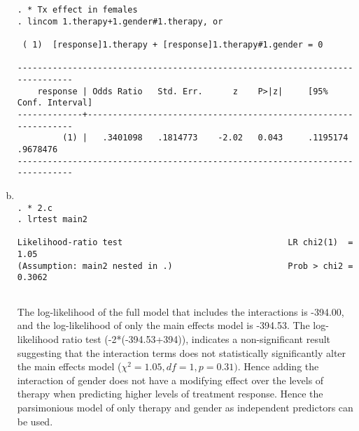 \documentclass{article}
\begin{document}
\begin{enumerate}[a.]
\begin{verbatim}
. * Tx effect in females
. lincom 1.therapy+1.gender#1.therapy, or

 ( 1)  [response]1.therapy + [response]1.therapy#1.gender = 0

------------------------------------------------------------------------------
    response | Odds Ratio   Std. Err.      z    P>|z|     [95% Conf. Interval]
-------------+----------------------------------------------------------------
         (1) |   .3401098   .1814773    -2.02   0.043     .1195174    .9678476
------------------------------------------------------------------------------

\end{verbatim}

\item 

\begin{verbatim}

. * 2.c
. lrtest main2

Likelihood-ratio test                                 LR chi2(1)  =      1.05
(Assumption: main2 nested in .)                       Prob > chi2 =    0.3062
    
\end{verbatim}
The log-likelihood of the full model that includes the interactions is -394.00, and the log-likelihood of only the main effects model is -394.53.  The log-likelihood ratio test (-2*(-394.53+394)), indicates a non-significant result suggesting that the interaction terms does not statistically significantly alter the main effects model ($\chi^{2}=1.05, df=1, p=0.31)$. Hence adding the interaction of gender does not have a modifying effect over the levels of therapy when predicting higher levels of treatment response.   Hence the parsimonious model of only therapy and gender as independent predictors can be used.


\end{enumerate}
\end{document}
